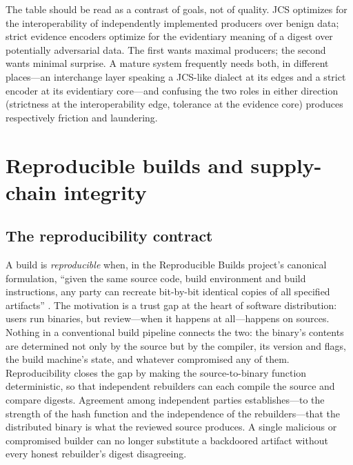 The table should be read as a contrast of goals, not of quality. JCS
optimizes for the interoperability of independently implemented
producers over benign data; strict evidence encoders optimize for the
evidentiary meaning of a digest over potentially adversarial data.
The first wants maximal producers; the second wants minimal surprise.
A mature system frequently needs both, in different places---an
interchange layer speaking a JCS-like dialect at its edges and a
strict encoder at its evidentiary core---and confusing the two roles
in either direction (strictness at the interoperability edge,
tolerance at the evidence core) produces respectively friction and
laundering.

\section{Reproducible builds and supply-chain integrity}\label{ch02:repro}

\subsection{The reproducibility contract}\label{ch02:repro-contract}

A build is \emph{reproducible} when, in the Reproducible Builds
project's canonical formulation, ``given the same source code, build
environment and build instructions, any party can recreate bit-by-bit
identical copies of all specified artifacts'' \cite{reprobuilds}. The motivation is
a trust gap at the heart of software distribution: users run
binaries, but review---when it happens at all---happens on sources.
Nothing in a conventional build pipeline connects the two: the
binary's contents are determined not only by the source but by the
compiler, its version and flags, the build machine's state, and
whatever compromised any of them. Reproducibility closes the gap by
making the source-to-binary function deterministic, so that
independent rebuilders can each compile the source and compare
digests. Agreement among independent parties establishes---to the
strength of the hash function and the independence of the
rebuilders---that the distributed binary is what the reviewed source
produces. A single malicious or compromised builder can no longer
substitute a backdoored artifact without every honest rebuilder's
digest disagreeing.

